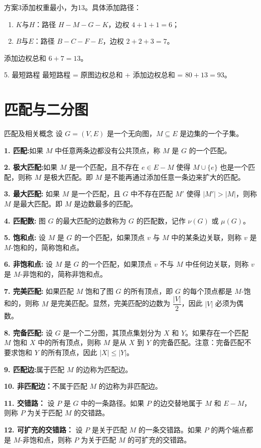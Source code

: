 \documentclass[lang=cn,11pt]{elegantbook}
\begin{document}
方案3添加权重最小，为13。具体添加路径：
\begin{enumerate}
    \item $K$与$H$：路径 $H-M-G-K$，边权 $4+1+1=6$；
    \item $B$与$E$：路径 $B-C-F-E$，边权 $2+2+3=7$。
\end{enumerate}
添加边权总和 $6+7=13$。

5. 最短路程
最短路程 = 原图边权总和 + 添加边权总和 = $80 + 13 = 93$。
\newpage
\section{匹配与二分图}
\begin{definition}{匹配及相关概念}
设 $G=(V,E)$ 是一个无向图，$M \subseteq E$ 是边集的一个子集。

\textbf{1. 匹配:}如果 $M$ 中任意两条边都没有公共顶点，称 $M$ 是 $G$ 的一个匹配。

\textbf{2. 极大匹配:}如果 $M$ 是一个匹配，且不存在 $e \in E- M$ 使得 $M \cup \{e\}$ 也是一个匹配，则称 $M$ 是极大匹配。即 $M$ 是不能再通过添加任意一条边来扩大的匹配。

\textbf{3. 最大匹配:}
如果 $M$ 是一个匹配，且 $G$ 中不存在匹配 $M'$ 使得 $|M'| > |M|$，则称 $M$ 是最大匹配。即 $M$ 是边数最多的匹配。

\textbf{4. 匹配数:}
图 $G$ 的最大匹配的边数称为 $G$ 的匹配数，记作 $\nu(G)$ 或 $\mu(G)$。

\textbf{5. 饱和点:}
设 $M$ 是 $G$ 的一个匹配，如果顶点 $v$ 与 $M$ 中的某条边关联，则称 $v$ 是 $M$-饱和的，简称饱和点。

\textbf{6. 非饱和点:}
设 $M$ 是 $G$ 的一个匹配，如果顶点 $v$ 不与 $M$ 中任何边关联，则称 $v$ 是 $M$-非饱和的，简称非饱和点。

\textbf{7. 完美匹配:}
如果匹配 $M$ 饱和了图 $G$ 的所有顶点，即 $G$ 的每个顶点都是 $M$-饱和的，则称 $M$ 是完美匹配。显然，完美匹配的边数为 $\dfrac{|V|}2$，因此 $|V|$ 必须为偶数。

\textbf{8. 完备匹配:}
设 $G$ 是一个二分图，其顶点集划分为 $X$ 和 $Y$。如果存在一个匹配 $M$ 饱和 $X$ 中的所有顶点，则称 $M$ 是从 $X$ 到 $Y$ 的完备匹配。注意：完备匹配不要求饱和 $Y$ 的所有顶点，因此 $|X| \leqslant |Y|$。

\textbf{9. 匹配边:}属于匹配 $M$ 的边称为匹配边。

\textbf{10. 非匹配边：}不属于匹配 $M$ 的边称为非匹配边。

\textbf{11. 交错路：}
设 $P$ 是 $G$ 中的一条路径。如果 $P$ 的边交替地属于 $M$ 和 $E- M$，则称 $P$ 为关于匹配 $M$ 的交错路。

\textbf{12. 可扩充的交错路：}
设 $P$ 是关于匹配 $M$ 的一条交错路。如果 $P$ 的两个端点都是 $M$-非饱和点，则称 $P$ 为关于匹配 $M$ 的可扩充的交错路。
\end{definition}
\end{document}
